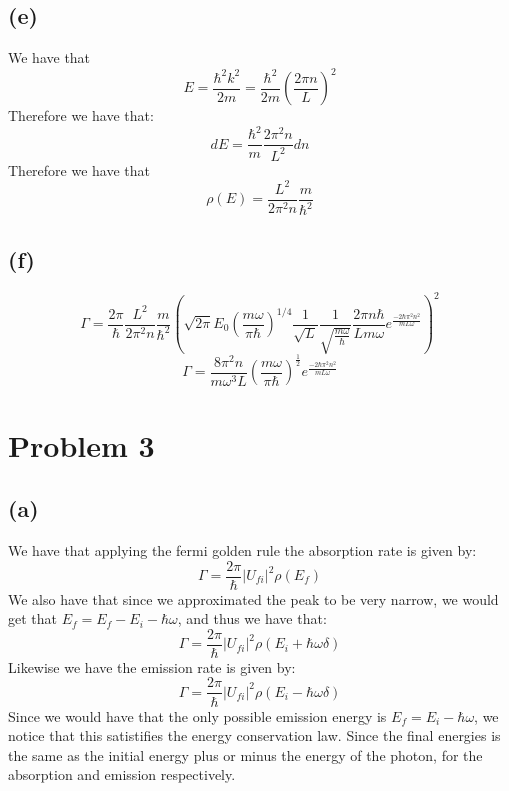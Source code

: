 \documentclass[11pt]{article}
\begin{document}
\subsection*{(e)}
We have that 
$$E = \frac{\hbar^2k^2}{2m} = \frac{\hbar^2}{2m}\left(\frac{2\pi n}{L}\right)^2$$
Therefore we have that:
$$dE = \frac{\hbar^2}{m}\frac{2\pi^2 n}{L^2}dn$$
Therefore we have that 
$$\rho(E) = \frac{L^2}{2\pi^2 n}\frac{m}{\hbar^2}$$
\subsection*{(f)}
$$\Gamma = \frac{2\pi}{\hbar} \frac{L^2}{2\pi^2 n}\frac{m}{\hbar^2}\left(\sqrt{2\pi}E_0\left(\frac{m\omega}{\pi\hbar}\right)^{1/4}\frac{1}{\sqrt{L}}\frac{1}{\sqrt{\frac{m\omega}{\hbar}}}\frac{2\pi n \hbar}{Lm\omega}e^{\frac{-2\hbar \pi^2 n^2}{mL\omega}}\right)^2$$
$$\Gamma = \frac{8\pi^2n}{m\omega^3L}\left(\frac{m\omega}{\pi\hbar}\right)^{\frac{1}{2}}e^{\frac{-2\hbar \pi^2 n^2}{mL\omega}}$$
\section*{Problem 3}
\subsection*{(a)}
We have that applying the fermi golden rule the absorption rate is given by:
$$\Gamma = \frac{2\pi}{\hbar}|U_{fi}|^2\rho(E_f)$$
We also have that since we approximated the peak to be very narrow, we would get that $E_f = E_f-E_i-\hbar\omega$, and thus we have that:
$$\Gamma = \frac{2\pi}{\hbar}|U_{fi}|^2\rho(E_i+\hbar\omega\delta)$$
Likewise we have the emission rate is given by:
$$\Gamma = \frac{2\pi}{\hbar}|U_{fi}|^2\rho(E_i-\hbar\omega\delta)$$
Since we would have that the only possible emission energy is $E_f = E_i-\hbar\omega$, we notice that this satistifies
the energy conservation law. Since the final energies is the same as the initial energy plus or minus the energy of the photon, for the 
absorption and emission respectively.
\end{document}
